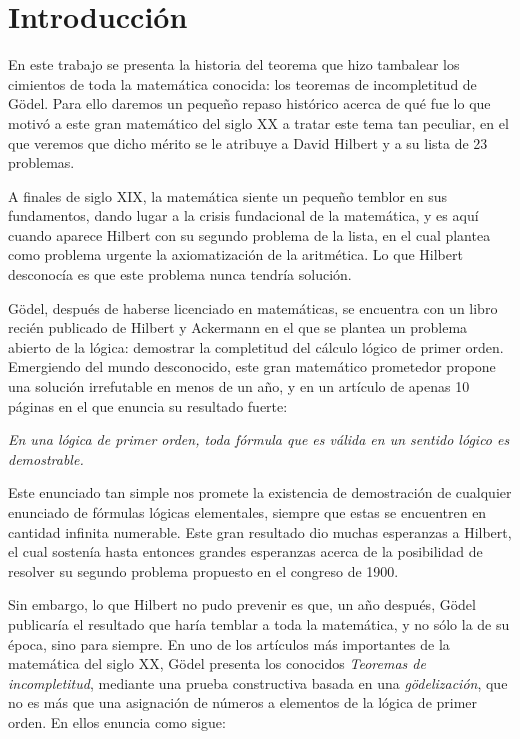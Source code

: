 %


\chapter{Introducción}

En este trabajo se presenta la historia del teorema que hizo tambalear los cimientos de toda la matemática conocida:
los teoremas de incompletitud de Gödel. Para ello daremos un pequeño repaso histórico acerca de qué fue lo 
que motivó a este gran matemático del siglo XX a tratar este tema tan peculiar, en el que veremos que dicho 
mérito se le atribuye a David Hilbert y a su lista de 23 problemas.

A finales de siglo XIX, la matemática  siente un pequeño temblor en sus fundamentos, dando lugar a la crisis fundacional
de la matemática, y es aquí cuando aparece Hilbert con su segundo problema de la lista, en el cual plantea como 
problema urgente la axiomatización de la aritmética. Lo que Hilbert desconocía es que este problema nunca tendría solución.

Gödel, después de haberse licenciado en matemáticas, se encuentra con un libro recién publicado de Hilbert y Ackermann en el que se plantea
un problema abierto de la lógica: demostrar la completitud del cálculo lógico 
de primer orden. Emergiendo del mundo desconocido, este gran matemático prometedor propone una solución irrefutable en menos de un año, 
y en un artículo de apenas 10 páginas en el que enuncia su resultado fuerte:

\begin{center}
    \textit{En una lógica de primer orden, toda fórmula que es válida en un sentido lógico es demostrable.}
\end{center}

Este enunciado tan simple nos promete la existencia de demostración de cualquier enunciado de fórmulas lógicas elementales, siempre
que estas se encuentren en cantidad infinita numerable. Este gran resultado dio muchas esperanzas a Hilbert, el cual sostenía 
hasta entonces grandes esperanzas acerca de la posibilidad de resolver su segundo problema propuesto en el congreso de 1900.

Sin embargo, lo que Hilbert no pudo prevenir es que, un año después, Gödel publicaría el resultado que haría temblar a toda la matemática, 
y no sólo la de su época, sino para siempre. En uno de los artículos más importantes de la matemática del siglo XX, Gödel presenta los 
conocidos \textit{Teoremas de incompletitud}, mediante una prueba constructiva basada en una \textit{gödelización}, que no es más que una asignación
de números a elementos de la lógica de primer orden. En ellos enuncia como sigue:

